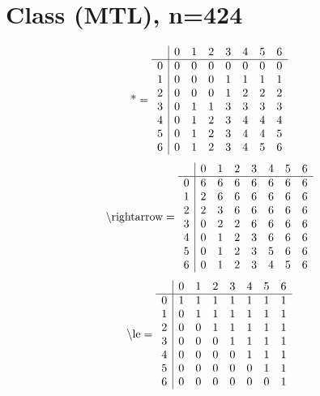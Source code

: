 \documentclass[11pt]{article}
\begin{document}
\section{Class (MTL), n=424}
\[\text{*} = 
\begin{array}{r | r r r r r r r}
 & 0 & 1 & 2 & 3 & 4 & 5 & 6 \\ \hline
0 & 0 & 0 & 0 & 0 & 0 & 0 & 0 \\
1 & 0 & 0 & 0 & 1 & 1 & 1 & 1 \\
2 & 0 & 0 & 0 & 1 & 2 & 2 & 2 \\
3 & 0 & 1 & 1 & 3 & 3 & 3 & 3 \\
4 & 0 & 1 & 2 & 3 & 4 & 4 & 4 \\
5 & 0 & 1 & 2 & 3 & 4 & 4 & 5 \\
6 & 0 & 1 & 2 & 3 & 4 & 5 & 6 \\
\end{array}
\]
\[\text{\textbackslash rightarrow} = 
\begin{array}{r | r r r r r r r}
 & 0 & 1 & 2 & 3 & 4 & 5 & 6 \\ \hline
0 & 6 & 6 & 6 & 6 & 6 & 6 & 6 \\
1 & 2 & 6 & 6 & 6 & 6 & 6 & 6 \\
2 & 2 & 3 & 6 & 6 & 6 & 6 & 6 \\
3 & 0 & 2 & 2 & 6 & 6 & 6 & 6 \\
4 & 0 & 1 & 2 & 3 & 6 & 6 & 6 \\
5 & 0 & 1 & 2 & 3 & 5 & 6 & 6 \\
6 & 0 & 1 & 2 & 3 & 4 & 5 & 6 \\
\end{array}
\]
\[\text{\textbackslash le} = 
\begin{array}{r | r r r r r r r}
 & 0 & 1 & 2 & 3 & 4 & 5 & 6 \\ \hline
0 & 1 & 1 & 1 & 1 & 1 & 1 & 1 \\
1 & 0 & 1 & 1 & 1 & 1 & 1 & 1 \\
2 & 0 & 0 & 1 & 1 & 1 & 1 & 1 \\
3 & 0 & 0 & 0 & 1 & 1 & 1 & 1 \\
4 & 0 & 0 & 0 & 0 & 1 & 1 & 1 \\
5 & 0 & 0 & 0 & 0 & 0 & 1 & 1 \\
6 & 0 & 0 & 0 & 0 & 0 & 0 & 1 \\
\end{array}
\]
\end{document}
